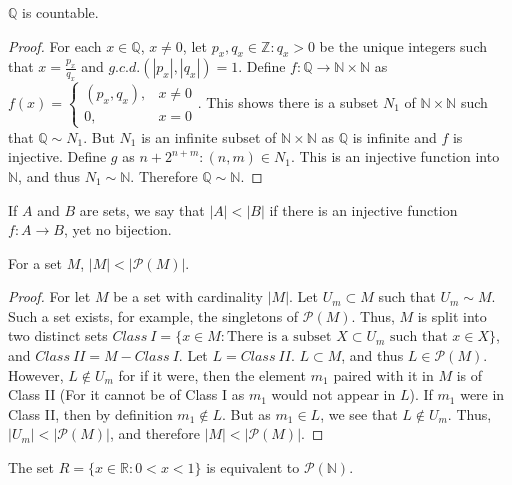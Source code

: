             \begin{theorem}
            $\mathbb{Q}$ is countable.
            \end{theorem}
            \begin{proof}
            For each $x\in \mathbb{Q}$, $x\ne 0$, let $p_x,q_x\in\mathbb{Z}:q_x>0$ be the unique integers such that $x = \frac{p_x}{q_x}$ and $g.c.d.(|p_x|,|q_x|)=1$. Define $f:\mathbb{Q}\rightarrow \mathbb{N}\times \mathbb{N}$ as $f(x) = \begin{cases}(p_x,q_x), & x\ne 0 \\ 0, & x=0\end{cases}$. This shows there is a subset $N_1$ of $\mathbb{N}\times \mathbb{N}$ such that $\mathbb{Q}\sim N_1$. But $N_1$ is an infinite subset of $\mathbb{N}\times\mathbb{N}$ as $\mathbb{Q}$ is infinite and $f$ is injective. Define $g$ as $n+2^{n+m}:(n,m)\in N_1$. This is an injective function into $\mathbb{N}$, and thus $N_1 \sim \mathbb{N}$. Therefore $\mathbb{Q}\sim \mathbb{N}$.
            \end{proof}
            \begin{definition}
            If $A$ and $B$ are sets, we say that $|A|<|B|$ if there is an injective function $f:A\rightarrow B$, yet no bijection.
            \end{definition}
            \begin{theorem}
            For a set $M$, $|M|<|\mathcal{P}(M)|$.
            \end{theorem}
            \begin{proof}
            For let $M$ be a set with cardinality $|M|$. Let $U_m \subset M$ such that $U_m \sim M$. Such a set exists, for example, the singletons of $\mathcal{P}(M)$. Thus, $M$ is split into two distinct sets $Class\ I=\{x\in M: \textrm{There is a subset } X\subset U_m\textrm{ such that }x\in X\}$, and $Class\ II=M-Class\ I$. Let $L = Class\ II$. $L\subset M$, and thus $L\in \mathcal{P}(M)$. However, $L \notin U_m$ for if it were, then the element $m_1$ paired with it in $M$ is of Class II (For it cannot be of Class I as $m_1$ would not appear in $L$). If $m_1$ were in Class II, then by definition $m_1 \notin L$. But as $m_1 \in L$, we see that $L\notin U_m$. Thus, $|U_m| <|\mathcal{P}(M)|$, and therefore $|M|<|\mathcal{P}(M)|$.
            \end{proof}
            \begin{theorem}
            The set $R=\{x\in \mathbb{R}:0<x<1\}$ is equivalent to $\mathcal{P}(\mathbb{N})$.
            \end{theorem}
